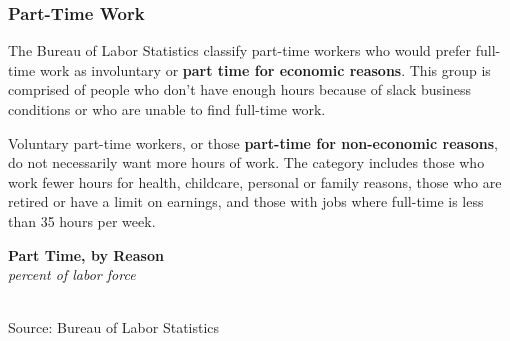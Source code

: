\documentclass{report}
\makeatletter
\newcommand{\tbllink}[1]{\href{https://raw.githubusercontent.com/bdecon/US-chartbook/master/chartbook/data/#1}{\faTable}}
\newcommand*\short[1]{\expandafter\@gobbletwo\number\numexpr#1\relax}
\newcommand{\absnode}[3]{\node[below right, align=left] at (axis cs: #1,#2) {#3};}
\newcommand{\shdateaxisticks}{
		date coordinates in=x, axis line style={draw=none},
		xmax={2023-10-01},
		max space between ticks=40,	    
		xtick={{1990-01-01}, {1995-01-01}, {2000-01-01}, 
			{2005-01-01}, {2010-01-01}, {2015-01-01}, {2020-01-01}},
		minor xtick={},
		enlarge y limits={0.06}, enlarge x limits={0.01},
		}
\newcommand{\bbar}[2]{extra #1 ticks = {{#2}}, extra #1 tick labels = ,
		extra #1 tick style = {grid=major, grid style={thick, black!25}},}
\newcommand{\stdline}[4]{\addplot[very thick, no markers, color=#1] 
		table [x=#2, y=#3, col sep=comma] {#4};	}
\newcommand{\rebars}{
		\fill[color=black!10] (axis cs:{2007-12-01},\pgfkeysvalueof{/pgfplots/ymin}) rectangle 
			(axis cs:{2009-07-01}, \pgfkeysvalueof{/pgfplots/ymax});
		\fill[color=black!10] (axis cs:{2001-03-01},\pgfkeysvalueof{/pgfplots/ymin}) rectangle 
			(axis cs:{2001-11-01}, \pgfkeysvalueof{/pgfplots/ymax});
		\fill[color=black!10] (axis cs:{2020-02-01},\pgfkeysvalueof{/pgfplots/ymin}) rectangle 
			(axis cs:{2020-05-01}, \pgfkeysvalueof{/pgfplots/ymax});}
\makeatother
\begin{document}
{\begin{minipage}{0.76\textwidth}
\subsubsection*{Part-Time Work}
\small  The Bureau of Labor Statistics classify part-time workers who would prefer full-time work as involuntary or \textbf{part time for economic reasons}. This group is comprised of people who don't have enough hours because of slack business conditions or who are unable to find full-time work. 

Voluntary part-time workers, or those \textbf{part-time for non-economic reasons}, do not necessarily want more hours of work. The category includes those who work fewer hours for health, childcare, personal or family reasons, those who are retired or have a limit on earnings, and those with jobs where full-time is less than 35 hours per week. 
\vspace{0.5mm}

\begin{minipage}{0.56\textwidth}
\normalsize \textbf{Part Time, by Reason}\\
\footnotesize{\textit{percent of labor force}}\\
\hspace*{-1mm} \\
\footnotesize{Source: Bureau of Labor Statistics} \hfill \tbllink{parttime.csv} 
\end{minipage}\hfill
\begin{minipage}{0.38\textwidth}
\small 
\end{minipage}
\vspace{1mm}


\end{minipage}}
\end{document}

